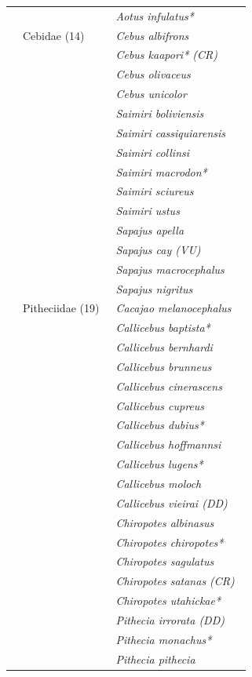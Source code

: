 \documentclass[
  letterpaper,
]{scrbook}
\begin{document}
\begin{longtable}[t]{ll>{}l}
\addlinespace
 &  & \em{Aotus infulatus* }\\
 & Cebidae (14)  & \em{Cebus albifrons }\\
 &  & \em{Cebus kaapori* (CR) }\\
 &  & \em{Cebus olivaceus }\\
 &  & \em{Cebus unicolor }\\
\addlinespace
 &  & \em{Saimiri boliviensis }\\
 &  & \em{Saimiri cassiquiarensis }\\
 &  & \em{Saimiri collinsi }\\
 &  & \em{Saimiri macrodon* }\\
 &  & \em{Saimiri sciureus }\\
\addlinespace
 &  & \em{Saimiri ustus }\\
 &  & \em{Sapajus apella }\\
 &  & \em{Sapajus cay (VU) }\\
 &  & \em{Sapajus macrocephalus }\\
 &  & \em{Sapajus nigritus }\\
\addlinespace
 & Pitheciidae (19)  & \em{Cacajao melanocephalus }\\
 &  & \em{Callicebus baptista* }\\
 &  & \em{Callicebus bernhardi }\\
 &  & \em{Callicebus brunneus }\\
 &  & \em{Callicebus cinerascens }\\
\addlinespace
 &  & \em{Callicebus cupreus }\\
 &  & \em{Callicebus dubius* }\\
 &  & \em{Callicebus hoffmannsi }\\
 &  & \em{Callicebus lugens* }\\
 &  & \em{Callicebus moloch }\\
\addlinespace
 &  & \em{Callicebus vieirai (DD) }\\
 &  & \em{Chiropotes albinasus }\\
 &  & \em{Chiropotes chiropotes* }\\
 &  & \em{Chiropotes sagulatus }\\
 &  & \em{Chiropotes satanas (CR) }\\
\addlinespace
 &  & \em{Chiropotes utahickae* }\\
 &  & \em{Pithecia irrorata (DD) }\\
 &  & \em{Pithecia monachus* }\\
 &  & \em{Pithecia pithecia }\\

\end{longtable}
\end{document}
